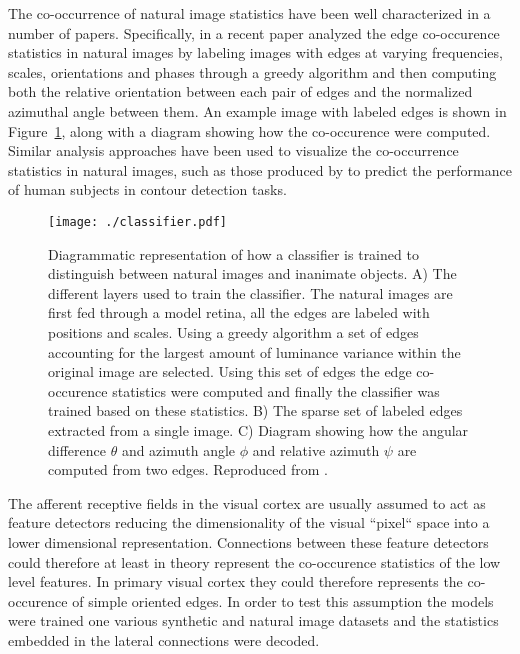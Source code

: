 The co-occurrence of natural image statistics have been well
characterized in a number of papers. Specifically, in a recent paper
\cite{Perrinet2015} analyzed the edge co-occurence statistics in
natural images by labeling images with edges at varying frequencies,
scales, orientations and phases through a greedy algorithm and then
computing both the relative orientation between each pair of edges and
the normalized azimuthal angle between them. An example image with
labeled edges is shown in Figure~\ref{classifier}, along with a
diagram showing how the co-occurence were computed. Similar analysis
approaches have been used to visualize the co-occurrence statistics in
natural images, such as those produced by \cite{Geisler2001} to
predict the performance of human subjects in contour detection tasks.

\begin{figure}
	\centering
    \texttt{[image: ./classifier.pdf]}
	\caption[] {Diagrammatic representation of how a classifier is
      trained to distinguish between natural images and inanimate
      objects. A) The different layers used to train the
      classifier. The natural images are first fed through a model
      retina, all the edges are labeled with positions and
      scales. Using a greedy algorithm a set of edges accounting for
      the largest amount of luminance variance within the original
      image are selected. Using this set of edges the edge
      co-occurence statistics were computed and finally the classifier
      was trained based on these statistics. B) The sparse set
      of labeled edges extracted from a single image. C) Diagram
      showing how the angular difference $\theta$ and azimuth angle
      $\phi$ and relative azimuth $\psi$ are computed from two
      edges. Reproduced from \cite{Perrinet2015}.}
	\label{classifier}
\end{figure}

The afferent receptive fields in the visual cortex are usually assumed
to act as feature detectors reducing the dimensionality of the visual
``pixel`` space into a lower dimensional representation. Connections
between these feature detectors could therefore at least in theory
represent the co-occurence statistics of the low level features. In
primary visual cortex they could therefore represents the co-occurence
of simple oriented edges. In order to test this assumption the models
were trained one various synthetic and natural image datasets and the
statistics embedded in the lateral connections were decoded.

